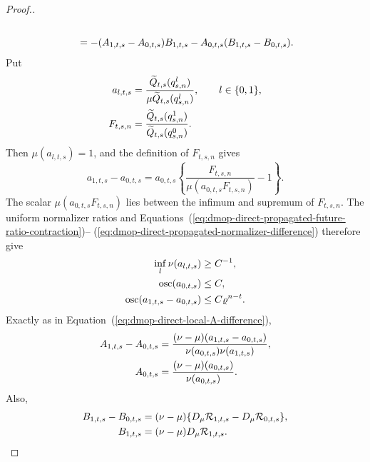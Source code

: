 \documentclass[11pt]{article}
\theoremstyle{thmstylethree}%
\begin{document}
\begin{proof}[Proof.]
\begin{align}
                                                               \notag\\
&\quad=
-(A_{1,t,s}-A_{0,t,s})B_{1,t,s}
-A_{0,t,s}(B_{1,t,s}-B_{0,t,s}).
\label{eq:dmop-direct-propagated-two-remainder-products}
\end{align}
Put
\begin{align}
a_{l,t,s}
&=
\frac{\widetilde Q_{t,s}(q_{s,n}^{l})}
{\mu\widetilde Q_{t,s}(q_{s,n}^{l})},
\qquad l\in\{0,1\},                                      \notag\\
F_{t,s,n}
&=
\frac{\widetilde Q_{t,s}(q_{s,n}^{1})}
{\widetilde Q_{t,s}(q_{s,n}^{0})}.
\label{eq:dmop-direct-propagated-normalized-denominators}
\end{align}
Then $\mu(a_{l,t,s})=1$, and the definition of $F_{t,s,n}$ gives
\begin{equation}
a_{1,t,s}-a_{0,t,s}
=
a_{0,t,s}
\left\{
\frac{F_{t,s,n}}{\mu(a_{0,t,s}F_{t,s,n})}-1
\right\}.
\label{eq:dmop-direct-propagated-normalizer-difference}
\end{equation}
The scalar $\mu(a_{0,t,s}F_{t,s,n})$ lies between the infimum and
supremum of $F_{t,s,n}$.  The uniform normalizer ratios and
Equations~(\ref{eq:dmop-direct-propagated-future-ratio-contraction})--
(\ref{eq:dmop-direct-propagated-normalizer-difference}) therefore give
\begin{align}
\inf_l\nu(a_{l,t,s})&\geq C^{-1},                          \notag\\
\operatorname{osc}(a_{0,t,s})&\leq C,                     \notag\\
\operatorname{osc}(a_{1,t,s}-a_{0,t,s})
&\leq C\varrho^{n-t}.
\label{eq:dmop-direct-propagated-normalizer-factor-bounds}
\end{align}
Exactly as in Equation~(\ref{eq:dmop-direct-local-A-difference}),
\begin{align}
A_{1,t,s}-A_{0,t,s}
&=
\frac{(\nu-\mu)(a_{1,t,s}-a_{0,t,s})}
{\nu(a_{0,t,s})\nu(a_{1,t,s})},                           \notag\\
A_{0,t,s}
&=
\frac{(\nu-\mu)(a_{0,t,s})}{\nu(a_{0,t,s})}.
\label{eq:dmop-direct-propagated-A-factor-identities}
\end{align}
Also,
\begin{align}
B_{1,t,s}-B_{0,t,s}
&=
(\nu-\mu)
\{D_\mu\mathcal R_{1,t,s}-D_\mu\mathcal R_{0,t,s}\},
                                                               \notag\\
B_{1,t,s}
&=(\nu-\mu)D_\mu\mathcal R_{1,t,s}.
\label{eq:dmop-direct-propagated-B-factor-identities}
\end{align}

\end{proof}
\end{document}
